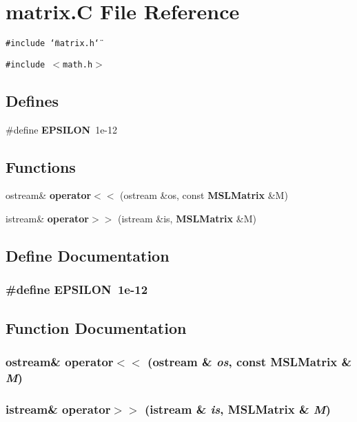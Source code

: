 \section{matrix.C File Reference}
\label{matrix_C}
{\tt \#include \char`\"{}matrix.h\char`\"{}}\par
{\tt \#include $<$math.h$>$}\par
\subsection*{Defines}
\begin{CompactItemize}
\item 
\#define {\bf EPSILON}\ 1e-12
\end{CompactItemize}
\subsection*{Functions}
\begin{CompactItemize}
\item 
ostream\& {\bf operator$<$$<$} (ostream \&os, const {\bf MSLMatrix} \&M)
\item 
istream\& {\bf operator$>$$>$} (istream \&is, {\bf MSLMatrix} \&M)
\end{CompactItemize}


\subsection{Define Documentation}
\subsubsection{\setlength{\rightskip}{0pt plus 5cm}\#define EPSILON\ 1e-12}\label{matrix_C_a0}




\subsection{Function Documentation}
\subsubsection{\setlength{\rightskip}{0pt plus 5cm}ostream\& operator$<$$<$ (ostream \& {\em os}, const {\bf MSLMatrix} \& {\em M})}\label{matrix_C_a1}


\subsubsection{\setlength{\rightskip}{0pt plus 5cm}istream\& operator$>$$>$ (istream \& {\em is}, {\bf MSLMatrix} \& {\em M})}\label{matrix_C_a2}


